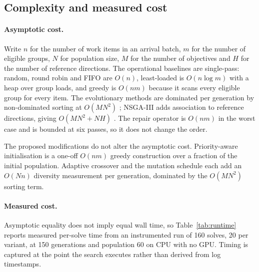 
\subsection{Complexity and measured cost}
\label{sec:complexity}

\paragraph{Asymptotic cost.}
Write $n$ for the number of work items in an arrival batch, $m$ for the number of eligible
groups, $N$ for population size, $M$ for the number of objectives and $H$ for the number of
reference directions. The operational baselines are single-pass: random, round robin and FIFO
are $O(n)$, least-loaded is $O(n \log m)$ with a heap over group loads, and greedy is $O(nm)$
because it scans every eligible group for every item. The evolutionary methods are dominated
per generation by non-dominated sorting at $O(M N^2)$ \citep{deb2002fast}; NSGA-III adds
association to reference directions, giving $O(M N^2 + N H)$ \citep{debjain2014evolutionary}.
The repair operator is $O(nm)$ in the worst case and is bounded at six passes, so it does not
change the order.

The proposed modifications do not alter the asymptotic cost. Priority-aware initialisation is
a one-off $O(nm)$ greedy construction over a fraction of the initial population. Adaptive
crossover and the mutation schedule each add an $O(N n)$ diversity measurement per generation,
dominated by the $O(M N^2)$ sorting term.

\paragraph{Measured cost.}
Asymptotic equality does not imply equal wall time, so Table~\ref{tab:runtime} reports
measured per-solve time from an instrumented run of 160 solves, 20 per variant, at 150
generations and population 60 on CPU with no GPU. Timing is captured at the point the search
executes rather than derived from log timestamps.

\begin{table}[htbp]
\centering
\caption{Measured wall time per solve. 20 solves per variant, 150 generations, population 60,
single CPU. Percentages are relative to standard NSGA-II.}
\label{tab:runtime}


\end{table}


